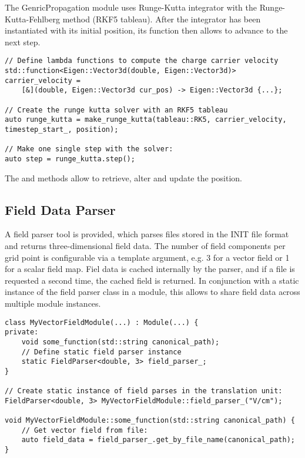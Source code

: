The GenricPropagation module uses Runge-Kutta integrator with the Runge-Kutta-Fehlberg method (RKF5 tableau).
After the integrator has been instantiated with its initial position, its  function then allows to advance to the next step.
\begin{verbatim}
// Define lambda functions to compute the charge carrier velocity
std::function<Eigen::Vector3d(double, Eigen::Vector3d)> carrier_velocity =
    [&](double, Eigen::Vector3d cur_pos) -> Eigen::Vector3d {...};

// Create the runge kutta solver with an RKF5 tableau
auto runge_kutta = make_runge_kutta(tableau::RK5, carrier_velocity, timestep_start_, position);

// Make one single step with the solver:
auto step = runge_kutta.step();
\end{verbatim}

The  and  methods allow to retrieve, alter and update the position.

\subsection{Field Data Parser}
A field parser tool is provided, which parses files stored in the INIT file format and returns three-dimensional field data.
The number of field components per grid point is configurable via a template argument, e.g. 3 for a vector field or 1 for a scalar field map.
Fiel data is cached internally by the parser, and if a file is requested a second time, the cached field is returned.
In conjunction with a static instance of the field parser class in a module, this allows to share field data across multiple module instances.

\begin{verbatim}
class MyVectorFieldModule(...) : Module(...) {
private:
    void some_function(std::string canonical_path);
    // Define static field parser instance
    static FieldParser<double, 3> field_parser_;
}

// Create static instance of field parses in the translation unit:
FieldParser<double, 3> MyVectorFieldModule::field_parser_("V/cm");

void MyVectorFieldModule::some_function(std::string canonical_path) {
    // Get vector field from file:
    auto field_data = field_parser_.get_by_file_name(canonical_path);
}
\end{verbatim}

